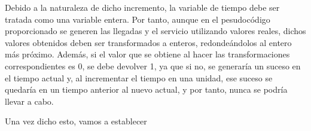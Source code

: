 \documentclass[11pt,a4paper]{article}
\begin{document}
Debido a la naturaleza de dicho incremento, la variable de tiempo debe ser tratada
como una variable entera. Por tanto, aunque en el pesudocódigo proporcionado se
generen las llegadas y el servicio utilizando valores reales, dichos valores obtenidos
deben ser transformados a enteros, redondeándolos al entero más próximo. Además, si
el valor que se obtiene al hacer las transformaciones correspondientes es 0, se
debe devolver 1, ya que si no, se generaría un suceso en el tiempo actual y, al
incrementar el tiempo en una unidad, ese suceso se quedaría en un tiempo anterior
al nuevo actual, y por tanto, nunca se podría llevar a cabo.

Una vez dicho esto, vamos a establecer
\end{document}
